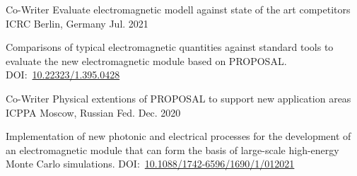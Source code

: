 \documentclass[11pt, a4paper]{Awesome-CV/awesome-cv}
\begin{document}
\begin{cventries}

    \cventry
    {Co-Writer} %
    {Evaluate electromagnetic modell against state of the art competitors} %
    {ICRC Berlin, Germany} %
    {Jul. 2021} %
    {
        \begin{cvitems} %
        \item {Comparisons of typical electromagnetic quantities against standard tools to evaluate the new electromagnetic module based on PROPOSAL.  DOI:~\href{https://doi.org/10.22323/1.395.0428}{10.22323/1.395.0428}
            }
        \end{cvitems}
    }

    \cventry
    {Co-Writer} %
    {Physical extentions of PROPOSAL to support new application areas} %
    {ICPPA Moscow, Russian Fed.} %
    {Dec. 2020} %
    {
        \begin{cvitems} %
        \item {Implementation of new photonic and electrical processes for the
                development of an electromagnetic module that can form the basis of
            large-scale high-energy Monte Carlo simulations. DOI:~\href{https://doi.org/10.1088/1742-6596/1690/1/012021}{10.1088/1742-6596/1690/1/012021}}
        \end{cvitems}
    }

\end{cventries}
\end{document}
